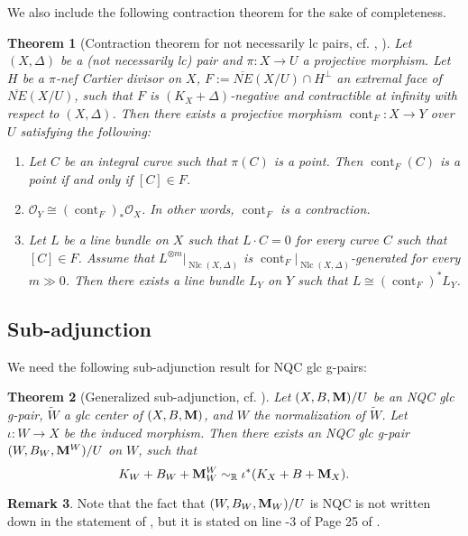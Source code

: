 \documentclass[11pt]{amsart}
\numberwithin{equation}{section}
\newcommand{\Mm}{{\bf{M}}}
\newcommand{\Qq}{\mathbb{Q}}
\newcommand{\Rr}{\mathbb{R}}
\newcommand{\Nlc}{\operatorname{Nlc}}
\newcommand{\cont}{\operatorname{cont}}
\newtheorem{thm}{Theorem}[section]
\theoremstyle{definition}
\theoremstyle{definition}
\newtheorem{rem}[thm]{Remark}
\theoremstyle{definition}
\begin{document}
We also include the following contraction theorem for the sake of completeness.
\begin{thm}[Contraction theorem for not necessarily lc pairs, {cf. \cite[Theorem 5.6, Lemma 6.3]{Amb03},  \cite[Theorems 4.5.2(4), 6.7.3]{Fuj11}}]\label{thm: contraction theorem for not necessarily lc pairs}
Let $(X,\Delta)$ be a (not necessarily lc) pair and $\pi: X\rightarrow U$ a projective morphism. Let $H$ be a $\pi$-nef Cartier divisor on $X$, $F:=\overline{NE}(X/U)\cap H^{\bot}$ an extremal face of $\overline{NE}(X/U)$, such that $F$ is $(K_X+\Delta)$-negative and contractible at infinity with respect to $(X,\Delta)$. Then there exists a projective morphism $\cont_F: X\rightarrow Y$ over $U$ satisfying the following:
\begin{enumerate}
    \item Let $C$ be an integral curve such that $\pi(C)$ is a point. Then $\cont_F(C)$ is a point if and only if $[C]\in F$.
    \item $\mathcal{O}_Y\cong(\cont_F)_*\mathcal{O}_X$. In other words, $\cont_F$ is a contraction.
    \item Let $L$ be a line bundle on $X$ such that $L\cdot C=0$ for every curve $C$ such that $[C]\in F$. Assume that $L^{\otimes m}|_{\Nlc(X,\Delta)}$ is $\cont_F|_{\Nlc(X,\Delta)}$-generated for every $m\gg 0$. Then there exists a line bundle $L_Y$ on $Y$ such that $L\cong(\cont_F)^*L_Y$.
\end{enumerate}
\end{thm}



\subsection{Sub-adjunction}

We need the following sub-adjunction result for NQC glc g-pairs:

\begin{thm}[Generalized sub-adjunction, {cf. \cite[Theorem 5.1]{HL19}}]\label{thm: gpair subadjunction}
Let $(X,B,\Mm)/U$ be an NQC glc g-pair, $\tilde W$ a glc center of $(X,B,\Mm)$, and $W$ the normalization of $\tilde W$. Let $\iota: W\rightarrow X$ be the induced morphism. Then there exists an NQC glc g-pair $(W,B_W,\Mm^W)/U$ on $W$, such that
$$K_{W}+B_W+\Mm^W_{W}\sim_{\Rr}\iota^*(K_X+B+\Mm_X).$$
\end{thm}
\begin{rem}
Note that the fact that $(W,B_W,\Mm_W)/U$ is NQC is not written down in the statement of \cite[Thereom 5.1]{HL19}, but it is stated on line -3 of Page 25 of \cite{HL19}.
\end{rem}
\end{document}
